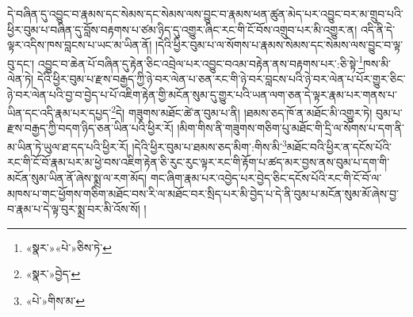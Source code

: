 དེ་བཞིན་དུ་འབྱུང་བ་རྣམས་དང་སེམས་དང་སེམས་ལས་བྱུང་བ་རྣམས་ཕན་ཚུན་མེད་པར་འབྱུང་བར་མ་གྲུབ་པའི་ཕྱིར་བུམ་པ་བཞིན་དུ་བློས་བརྟགས་པ་ཙམ་ཉིད་དུ་འགྱུར་ཞིང་རང་གི་ངོ་བོས་འགྲུབ་པར་མི་འགྱུར་ན། འདི་ནི་དེ་ལྟར་འདིས་ཁས་བླངས་པ་ཡང་མ་ཡིན་ནོ། །དེའི་ཕྱིར་བུམ་པ་ལ་སོགས་པ་རྣམས་སེམས་དང་སེམས་ལས་བྱུང་བ་ལྟ་བུ་དང་། འབྱུང་བ་ཆེན་པོ་བཞིན་དུ་རྟེན་ཅིང་འབྲེལ་པར་འབྱུང་བའམ་བརྟེན་ནས་བརྟགས་པར་:ཅི་སྟེ་\footnote{«སྣར་»«པེ་»ཅིས་ཏེ་}ཁས་མི་ལེན་ཏེ། དེའི་ཕྱིར་བུམ་པ་རྫས་བརྒྱད་ཀྱི་ཉེ་བར་ལེན་པ་ཅན་རང་གི་ཉེ་བར་བླངས་པའི་ཉེ་བར་ལེན་པ་པོར་གྱུར་ཅིང་ཉེ་བར་ལེན་པའི་བྱ་བ་བྱེད་པ་པོ་འཇིག་རྟེན་གྱི་མངོན་སུམ་དུ་གྱུར་པའི་ཡན་ལག་ཅན་དེ་ལྟར་རྣམ་པར་གནས་པ་ཡིན་དང་འདི་རྣམ་པར་དཔྱད་\footnote{«སྣར་»བྱེད་}དེ། གཟུགས་མཐོང་ཚེ་ན་བུམ་པ་ནི། །ཐམས་ཅད་ཁོ་ན་མཐོང་མི་འགྱུར་ཏེ། བུམ་པ་རྫས་བརྒྱད་ཀྱི་བདག་ཉིད་ཅན་ཡིན་པའི་ཕྱིར་རོ། །མིག་གིས་ནི་གཟུགས་གཅིག་པུ་མཐོང་གི་དྲི་ལ་སོགས་པ་དག་ནི་མ་ཡིན་ཏེ་ཡུལ་ཐ་དད་པའི་ཕྱིར་རོ། །དེའི་ཕྱིར་བུམ་པ་ཐམས་ཅད་མིག་:གིས་མི་\footnote{«པེ་»གིས་མ་}མཐོང་བའི་ཕྱིར་ན་དངོས་པོའི་རང་གི་ངོ་བོ་རྣམ་པར་མ་ཕྱེ་བས་འཇིག་རྟེན་ཅི་རུང་རུང་ལྟར་རང་གི་རྟོག་པ་ཚད་མར་བྱས་ནས་བུམ་པ་དག་གི་མངོན་སུམ་ཡིན་ནོ་ཞེས་སྨྲ་ལ་རག་མོད། གང་ཞིག་རྣམ་པར་འབྱེད་པར་བྱེད་ཅིང་དངོས་པོའི་རང་གི་ངོ་བོ་ལ་མཁས་པ་གང་ཕྱོགས་གཅིག་མཐོང་བས་རི་ལ་མཐོང་བར་སྲིད་པར་མི་བྱེད་པ་དེ་ནི་བུམ་པ་མངོན་སུམ་མོ་ཞེས་བྱ་བ་རྣམ་པ་དེ་ལྟ་བུར་སྨྲ་བར་མི་འོས་སོ། །
